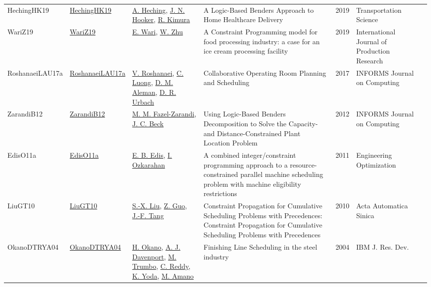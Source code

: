 {\begin{longtable}{p{2cm}p{2cm}p{5cm}p{10cm}rp{3cm}l}
HechingHK19 & \href{http://dx.doi.org/10.1287/trsc.2018.0830}{HechingHK19} & \hyperref[auth:a1022]{A. Heching}, \hyperref[auth:a160]{J. N. Hooker}, \hyperref[auth:a1023]{R. Kimura} & \cellcolor{gold!20}A Logic-Based Benders Approach to Home Healthcare Delivery & 2019 & \cellcolor{red!20}Transportation Science & \cite{HechingHK19}\\
WariZ19 & \href{http://dx.doi.org/10.1080/00207543.2019.1571250}{WariZ19} & \hyperref[auth:a839]{E. Wari}, \hyperref[auth:a840]{W. Zhu} & A Constraint Programming model for food processing industry: a case for an ice cream processing facility & 2019 & \cellcolor{red!20}International Journal of Production Research & \cite{WariZ19}\\
RoshanaeiLAU17a & \href{http://dx.doi.org/10.1287/ijoc.2017.0745}{RoshanaeiLAU17a} & \hyperref[auth:a728]{V. Roshanaei}, \hyperref[auth:a927]{C. Luong}, \hyperref[auth:a895]{D. M. Aleman}, \hyperref[auth:a896]{D. R. Urbach} & Collaborative Operating Room Planning and Scheduling & 2017 & \cellcolor{red!20}INFORMS Journal on Computing & \cite{RoshanaeiLAU17a}\\
ZarandiB12 & \href{http://dx.doi.org/10.1287/ijoc.1110.0458}{ZarandiB12} & \hyperref[auth:a946]{M. M. Fazel-Zarandi}, \hyperref[auth:a89]{J. C. Beck} & Using Logic-Based Benders Decomposition to Solve the Capacity- and Distance-Constrained Plant Location Problem & 2012 & \cellcolor{red!20}INFORMS Journal on Computing & \cite{ZarandiB12}\\
EdisO11a & \href{http://dx.doi.org/10.1080/03052151003759117}{EdisO11a} & \hyperref[auth:a346]{E. B. Edis}, \hyperref[auth:a348]{I. Ozkarahan} & A combined integer/constraint programming approach to a resource-constrained parallel machine scheduling problem with machine eligibility restrictions & 2011 & \cellcolor{red!20}Engineering Optimization & \cite{EdisO11a}\\
LiuGT10 & \href{http://dx.doi.org/10.3724/sp.j.1004.2010.00603}{LiuGT10} & \hyperref[auth:a1221]{S.-X. Liu}, \hyperref[auth:a1222]{Z. Guo}, \hyperref[auth:a1223]{J.-F. Tang} & Constraint Propagation for Cumulative Scheduling Problems with Precedences: Constraint Propagation for Cumulative Scheduling Problems with Precedences & 2010 & \cellcolor{red!20}Acta Automatica Sinica & \cite{LiuGT10}\\
OkanoDTRYA04 & \href{https://doi.org/10.1147/rd.485.0811}{OkanoDTRYA04} & \hyperref[auth:a1289]{H. Okano}, \hyperref[auth:a248]{A. J. Davenport}, \hyperref[auth:a1290]{M. Trumbo}, \hyperref[auth:a250]{C. Reddy}, \hyperref[auth:a1291]{K. Yoda}, \hyperref[auth:a1292]{M. Amano} & Finishing Line Scheduling in the steel industry & 2004 & {IBM} J. Res. Dev. & \cite{OkanoDTRYA04}\\

\end{longtable}}
